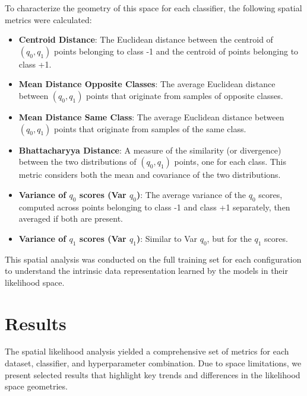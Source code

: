 \documentclass[conference]{IEEEtran}
\begin{document}
To characterize the geometry of this space for each classifier, the following spatial metrics were calculated:
\begin{itemize}
    \item \textbf{Centroid Distance}: The Euclidean distance between the centroid of $(q_0, q_1)$ points belonging to class -1 and the centroid of points belonging to class +1.
    \item \textbf{Mean Distance Opposite Classes}: The average Euclidean distance between $(q_0, q_1)$ points that originate from samples of opposite classes.
    \item \textbf{Mean Distance Same Class}: The average Euclidean distance between $(q_0, q_1)$ points that originate from samples of the same class.
    \item \textbf{Bhattacharyya Distance}: A measure of the similarity (or divergence) between the two distributions of $(q_0, q_1)$ points, one for each class. This metric considers both the mean and covariance of the two distributions.
    \item \textbf{Variance of $q_0$ scores (Var $q_0$)}: The average variance of the $q_0$ scores, computed across points belonging to class -1 and class +1 separately, then averaged if both are present.
    \item \textbf{Variance of $q_1$ scores (Var $q_1$)}: Similar to Var $q_0$, but for the $q_1$ scores.
\end{itemize}
This spatial analysis was conducted on the full training set for each configuration to understand the intrinsic data representation learned by the models in their likelihood space.

\section{Results}
The spatial likelihood analysis yielded a comprehensive set of metrics for each dataset, classifier, and hyperparameter combination. Due to space limitations, we present selected results that highlight key trends and differences in the likelihood space geometries.
\end{document}
